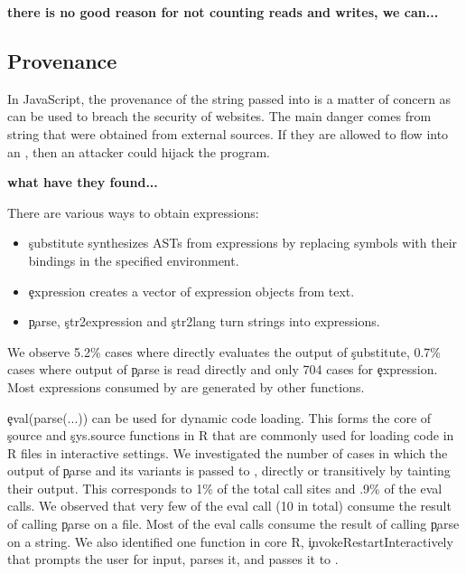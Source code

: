 \documentclass[conference]{IEEEtran}
\newcommand{\PercentParsedEvals}{.9\%\xspace}
\newcommand{\PercentParsedCallSites}{1\%\xspace}
\newcommand{\NbParseFilesRnd}{10\xspace}
\begin{document}
{\bf there is no good reason for not counting reads and writes, we can...}




\subsection{Provenance}

In JavaScript, the provenance of the string passed into \eval is a matter of
concern as \eval can be used to breach the security of websites. The main
danger comes from string that were obtained from external sources. If they
are allowed to flow into an \eval, then an attacker could hijack the
program.

{\bf what have they found...}

There are various ways to obtain expressions:
\begin{itemize}
  \item \c{substitute} synthesizes ASTs from expressions by replacing
    symbols with their bindings in the specified environment.
  \item \c{expression}  creates a vector of expression
    objects from text.
  \item \c{parse}, \c{str2expression} and \c{str2lang} turn strings into
    expressions.
\end{itemize}

We observe 5.2\% cases where \eval directly evaluates the output of
\c{substitute}, 0.7\% cases where output of \c{parse} is read directly and
only 704 cases for \c{expression}. Most expressions consumed by \eval are
generated by other functions.

\c{eval(parse(...))} can be used for dynamic code loading. This forms the
core of \c{source} and \c{sys.source} functions in R that are commonly used
for loading code in R files in interactive settings. We investigated the
number of cases in which the output of \c{parse} and its variants is passed
to \eval, directly or transitively by tainting their output. This
corresponds to \PercentParsedCallSites of the total \eval call sites and
\PercentParsedEvals of the eval calls. We observed that very few of the eval
call (\NbParseFilesRnd in total) consume the result of calling \c{parse} on
a file. Most of the eval calls consume the result of calling \c{parse} on a
string.  We also identified one function in core R,
\c{invokeRestartInteractively} that prompts the user for input, parses it,
and passes it to \eval.
\end{document}
